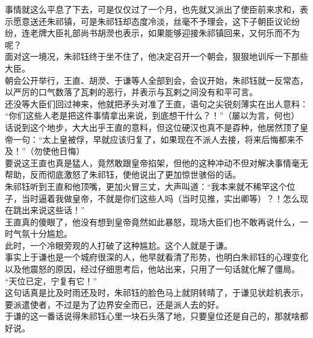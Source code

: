 \begin{multicols}{\theparacolNo}
事情就这么平息了下去，可是仅仅过了一个月，也先就又派出了使臣前来求和，表示愿意送还朱祁镇，可是朱祁钰却态度冷淡，丝毫不予理会，这下子朝臣议论纷纷，连老牌大臣礼部尚书胡濙也表示，如果能够迎接朱祁镇回来，又何乐而不为呢？\\

面对这一境况，朱祁钰终于坐不住了，他决定召开一个朝会，狠狠地训斥一下那些大臣。\\

朝会公开举行，王直、胡濙、于谦等人全部到会，会议开始，朱祁钰就一反常态，以严厉的口气数落了瓦剌的恶行，并表示与瓦剌之间没有和平可言。\\

还没等大臣们回过神来，他就把矛头对准了王直，语句之尖锐刻薄实在出人意料：\\

“你们这些人老是把这件事情拿出来说，到底想干什么？！”（屡以为言，何也）\\

话说到这个地步，大大出乎王直的意料，但这位硬汉也真不是孬种，他居然顶了皇帝一句：“太上皇被俘，早就应该归复了，如果现在不派人去接，将来后悔都来不及！”（勿使他日悔）\\

要说这王直也真是猛人，竟然敢跟皇帝掐架，但他的这种冲动不但对解决事情毫无帮助，反而彻底激怒了朱祁钰，使他说出了更加惊世骇俗的话。\\

朱祁钰听到王直和他顶嘴，更加火冒三丈，大声叫道：“我本来就不稀罕这个位子，当时逼着我做皇帝，不就是你们这些人吗（当时见推，实出卿等）？！怎么现在跳出来说这些话！”\\

王直真的傻眼了，他没有想到皇帝竟然如此暴怒，现场大臣们也不敢再说什么，一时气氛十分尴尬。\\

此时，一个冷眼旁观的人打破了这种尴尬。这个人就是于谦。\\

事实上于谦也是一个城府很深的人，他早就看清了形势，也明白朱祁钰的心理变化以及他震怒的原因，经过仔细思考后，他站出来，只用了一句话就化解了僵局。\\

“天位已定，宁复有它！”\\

这句话真是比及时雨还及时，朱祁钰的脸色马上就阴转晴了，于谦见状趁机表示，要派遣使者，不过是为了边界安全而已，还是派人去的好。\\

于谦的这一番话说得朱祁钰心里一块石头落了地，只要皇位还是自己的，那就啥都好说。\\


\end{multicols}
